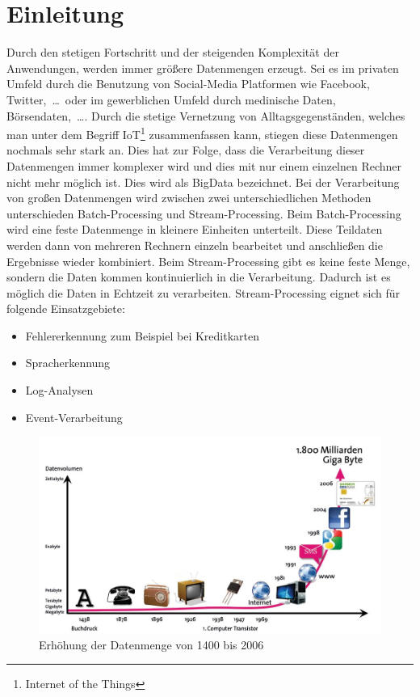 \chapter{Einleitung}
Durch den stetigen Fortschritt und der steigenden Komplexität der Anwendungen,
werden immer größere Datenmengen erzeugt. Sei es im privaten Umfeld durch die
Benutzung von Social-Media Platformen wie Facebook, Twitter,~\dots~oder im
gewerblichen Umfeld durch medinische Daten, Börsendaten,~\dots . Durch die
stetige Vernetzung von Alltagsgegenständen, welches man unter dem Begriff
IoT\footnote{Internet of the Things} zusammenfassen kann, stiegen diese
Datenmengen nochmals sehr stark an. Dies hat zur Folge, dass die Verarbeitung
dieser Datenmengen immer komplexer wird und dies mit nur einem einzelnen Rechner
nicht mehr möglich ist. Dies wird als \gls{BigData} bezeichnet. Bei der
Verarbeitung von großen Datenmengen wird zwischen zwei unterschiedlichen Methoden
unterschieden Batch-Processing und Stream-Processing. Beim Batch-Processing wird
eine feste Datenmenge in kleinere Einheiten unterteilt. Diese Teildaten werden
dann von mehreren Rechnern einzeln bearbeitet und anschließen die Ergebnisse
wieder kombiniert. Beim Stream-Processing gibt es keine feste Menge, sondern
die Daten kommen kontinuierlich in die Verarbeitung. Dadurch ist es möglich die
Daten in Echtzeit zu verarbeiten. Stream-Processing eignet sich für folgende
Einsatzgebiete:

\begin{itemize}
\item Fehlererkennung zum Beispiel bei Kreditkarten
\item Spracherkennung
\item Log-Analysen
\item Event-Verarbeitung
\end{itemize}

\begin{figure}
\centering
\includegraphics[scale=0.375]{../material/images/bitkom-lf-bigdata-2012-data_grow.jpg}
\caption{Erhöhung der Datenmenge von 1400 bis 2006 \parencite{Weber2012}}
\label{fig:data-grow}
\end{figure}

